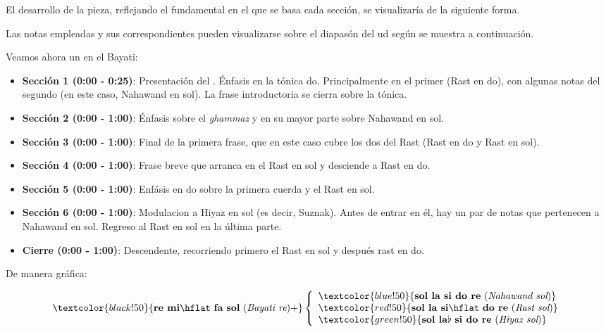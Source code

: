 El desarrollo de la pieza, reflejando el \yins fundamental en el que se basa cada sección, se visualizaría de la siguiente forma.

\vspace*{.5cm}

Las notas empleadas y sus correspondientes \ashnas pueden visualizarse sobre el diapasón del ud según se muestra a continuación.



Veamos ahora un \taqsim en el \maqam Bayati:


\begin{itemize}
\item \textbf{Sección 1 (0:00 - 0:25)}: Presentación del \maqam. Énfasis en la tónica do. Principalmente en el primer \yins (Rast en do), con algunas notas del segundo (en este caso, Nahawand en sol). La frase introductoria se cierra sobre la tónica.
\item \textbf{Sección 2 (0:00 - 1:00)}: Énfasis sobre el \emph{ghammaz} y en su mayor parte sobre Nahawand en sol.
\item \textbf{Sección 3 (0:00 - 1:00)}: Final de la primera frase, que en este caso cubre los dos \ashnas del \maqam Rast (Rast en do y Rast en sol).
\item \textbf{Sección 4 (0:00 - 1:00)}: Frase breve que arranca en el \yins Rast en sol y desciende a Rast en do.
\item \textbf{Sección 5 (0:00 - 1:00)}: Enfásis en do sobre la primera cuerda y el \yins Rast en sol.
\item \textbf{Sección 6 (0:00 - 1:00)}: Modulacion a \yins Hiyaz en sol (es decir, \maqam Suznak). Antes de entrar en él, hay un par de notas que pertenecen a Nahawand en sol. Regreso al \yins Rast en sol en la última parte.
\item \textbf{Cierre (0:00 - 1:00)}: Descendente, recorriendo primero el \yins Rast en sol y después rast en do.
\end{itemize}

De manera gráfica:

\[
    \textcolor{black!50}{\text{\textbf{re mi}}\hflat\ \text{\textbf{fa sol} ({\it Bayati re})}+} \left\{\begin{array}{lr}
        \textcolor{blue!50}{\text{\textbf{sol la si do re} ({\it Nahawand sol})}}\\
        \textcolor{red!50}{\text{\textbf{sol la si}}\hflat\ \text{\textbf{do re} ({\it Rast sol})}}\\
        \textcolor{green!50}{\text{\textbf{sol la}}\flat\ \text{\textbf{si do re} ({\it Hiyaz sol})}}
        \end{array}\right.
  \]

